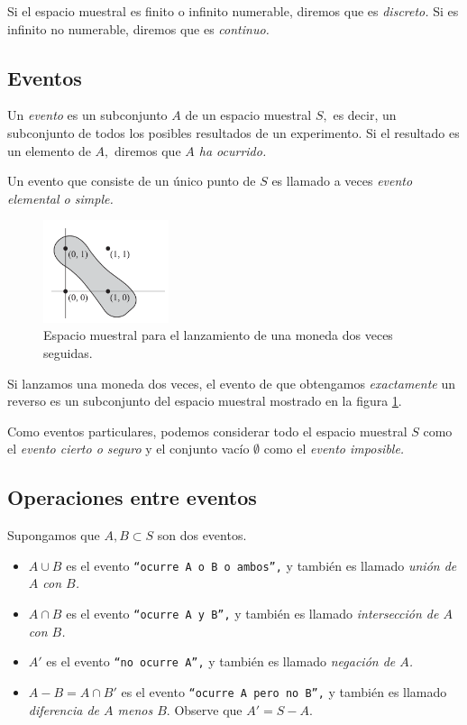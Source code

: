 Si el espacio muestral es finito o infinito numerable, diremos que es \emph{discreto.}  Si es infinito no numerable, diremos que es \emph{continuo.}

\subsection{Eventos}

Un \emph{evento} es un subconjunto $A$ de un espacio muestral $S,$ es decir, un subconjunto de todos los posibles resultados de un experimento. Si el resultado es un elemento de $A,$ diremos que \emph{$A$ ha ocurrido.} 

Un evento que consiste de un único punto de $S$ es llamado a veces \emph{evento elemental o simple.}


\begin{figure}
	\centering
	\includegraphics[height=3cm,keepaspectratio=true]{./pe/pands0102.png}
	\caption{Espacio muestral para el lanzamiento de una moneda dos veces seguidas.}
	\label{pands0102}
\end{figure}



\begin{ejemplo}
 \label{exmp:1.8}
 Si lanzamos una moneda dos veces, el evento de que obtengamos \emph{exactamente} un reverso  es un subconjunto del espacio muestral mostrado en la figura \ref{pands0102}.
\end{ejemplo}



Como eventos particulares, podemos considerar todo el espacio muestral $S$ como el \emph{evento cierto o seguro} y el conjunto vacío $\emptyset$ como el \emph{evento imposible.}


\subsection{Operaciones entre eventos} 
Supongamos que $A,B \subset S$ son dos eventos. 
\begin{itemize}
 \item $A\cup B$ es el evento \texttt{``ocurre $A$ o $B$ o ambos'',} y también es llamado \emph{unión de $A$ con $B$.}  
 \item $A\cap B$ es el evento \texttt{``ocurre $A$ y $B$'',} y también es llamado \emph{intersección de $A$ con $B$.}  
 \item $A'$ es el evento \texttt{``no ocurre $A$'',} y también es llamado \emph{negación de $A$.} 
 \item $A-B=A\cap B'$ es el evento \texttt{``ocurre $A$ pero no $B$'',} y también es llamado \emph{diferencia de $A$ menos $B.$}  Observe que
 $A' = S - A.$
\end{itemize}

